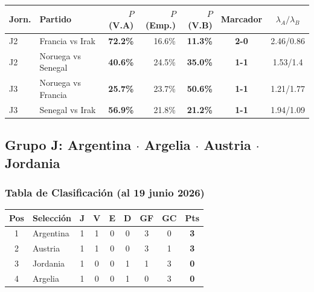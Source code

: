 \documentclass[11pt,a4paper]{article}
\newcommand{\prob}[1]{\textbf{#1\%}}
\begin{document}
\begin{center}
\begin{tabular}{@{}llrrrcc@{}}
\toprule
\textbf{Jorn.} & \textbf{Partido} & \textbf{$P$(V.A)} & \textbf{$P$(Emp.)} & \textbf{$P$(V.B)} & \textbf{Marcador} & \textbf{$\lambda_A/\lambda_B$} \\
\midrule
  J2 & Francia vs Irak & \cellcolor{green!20}\prob{72.2} & 16.6\% & \cellcolor{red!15}\prob{11.3} & \textbf{2-0} & 2.46/0.86 \\
  J2 & Noruega vs Senegal & \cellcolor{red!15}\prob{40.6} & 24.5\% & \cellcolor{red!15}\prob{35.0} & \textbf{1-1} & 1.53/1.4 \\
  J3 & Noruega vs Francia & \cellcolor{red!15}\prob{25.7} & 23.7\% & \cellcolor{yellow!30}\prob{50.6} & \textbf{1-1} & 1.21/1.77 \\
  J3 & Senegal vs Irak & \cellcolor{yellow!30}\prob{56.9} & 21.8\% & \cellcolor{red!15}\prob{21.2} & \textbf{1-1} & 1.94/1.09 \\
\bottomrule
\end{tabular}
\end{center}


\subsection{Grupo J: Argentina $\cdot$ Argelia $\cdot$ Austria $\cdot$ Jordania}

\subsubsection*{Tabla de Clasificación (al 19 junio 2026)}


\begin{center}
\begin{tabular}{@{}clccccccc@{}}
\toprule
\textbf{Pos} & \textbf{Selección} & \textbf{J} & \textbf{V} & \textbf{E} & \textbf{D} & \textbf{GF} & \textbf{GC} & \textbf{Pts} \\
\midrule
  \cellcolor{green!25}1 & \cellcolor{green!25}Argentina & 1 & 1 & 0 & 0 & 3 & 0 & \textbf{3} \\
  \cellcolor{green!25}2 & \cellcolor{green!25}Austria & 1 & 1 & 0 & 0 & 3 & 1 & \textbf{3} \\
  \cellcolor{yellow!20}3 & \cellcolor{yellow!20}Jordania & 1 & 0 & 0 & 1 & 1 & 3 & \textbf{0} \\
  4 & Argelia & 1 & 0 & 0 & 1 & 0 & 3 & \textbf{0} \\
\bottomrule
\end{tabular}
\end{center}
\end{document}
